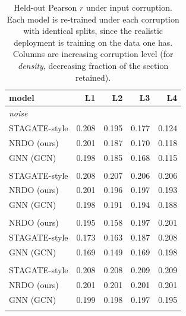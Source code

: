 \begin{table}[htbp]
\centering
\small
\caption{Held-out Pearson $r$ under input corruption. Each model is re-trained under each corruption with identical splits, since the realistic deployment is training on the data one has. Columns are increasing corruption level (for \emph{density}, decreasing fraction of the section retained).}
\label{tab:robustness}
\begin{tabular}{lrrrr}
\toprule
model & L1 & L2 & L3 & L4\\
\midrule
\multicolumn{5}{l}{\emph{noise}} \\
\quad STAGATE-style & 0.208 & 0.195 & 0.177 & 0.124 \\
\quad NRDO (ours) & 0.201 & 0.187 & 0.170 & 0.118 \\
\quad GNN (GCN) & 0.198 & 0.185 & 0.168 & 0.115 \\
\addlinespace
\multicolumn{5}{l}{\emph{dropout}} \\
\quad STAGATE-style & 0.208 & 0.207 & 0.206 & 0.206 \\
\quad NRDO (ours) & 0.201 & 0.196 & 0.197 & 0.193 \\
\quad GNN (GCN) & 0.198 & 0.191 & 0.194 & 0.188 \\
\addlinespace
\multicolumn{5}{l}{\emph{density}} \\
\quad NRDO (ours) & 0.195 & 0.158 & 0.197 & 0.201 \\
\quad STAGATE-style & 0.173 & 0.163 & 0.187 & 0.208 \\
\quad GNN (GCN) & 0.169 & 0.149 & 0.169 & 0.198 \\
\addlinespace
\multicolumn{5}{l}{\emph{knn}} \\
\quad STAGATE-style & 0.208 & 0.208 & 0.209 & 0.209 \\
\quad NRDO (ours) & 0.201 & 0.201 & 0.201 & 0.201 \\
\quad GNN (GCN) & 0.199 & 0.198 & 0.197 & 0.195 \\
\addlinespace
\bottomrule
\end{tabular}
\end{table}
